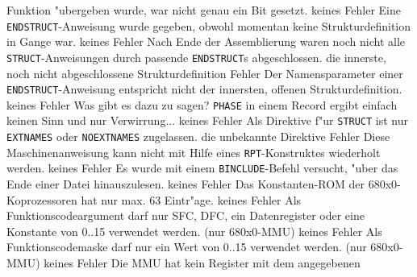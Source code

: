 \documentclass[12pt,a4paper,twoside]{report}
\newcommand{\tty}[1]{{\tt #1}}
\begin{document}
{\begin{description}
{                Funktion "ubergeben wurde, war nicht genau ein Bit
                gesetzt.}
               {keines}
               {Fehler}
               {Eine \tty{ENDSTRUCT}-Anweisung wurde gegeben, obwohl
                momentan keine Strukturdefinition in Gange war.}
               {keines}
               {Fehler}
               {Nach Ende der Assemblierung waren noch nicht alle
                \tty{STRUCT}-Anweisungen durch passende \tty{ENDSTRUCT}s
                abgeschlossen.}
               {die innerste, noch nicht abgeschlossene
                Strukturdefinition}
               {Fehler}
               {Der Namensparameter einer \tty{ENDSTRUCT}-Anweisung
                entspricht nicht der innersten, offenen
                Strukturdefinition.}
               {keines}
               {Fehler}
               {Was gibt es dazu zu sagen?  \tty{PHASE} in einem Record
                ergibt einfach keinen Sinn und nur Verwirrung...}
               {keines}
\errentry{1554}{ung"ultige \tty{STRUCT}-Direktive}
               {Fehler}
               {Als Direktive f"ur \tty{STRUCT} ist nur
                \tty{EXTNAMES} oder \tty{NOEXTNAMES} zugelassen.}
               {die unbekannte Direktive}
               {Fehler} 
               {Diese Maschinenanweisung kann nicht mit Hilfe eines
                {\tt RPT}-Konstruktes wiederholt werden.}
               {keines}
               {Fehler}
               {Es wurde mit einem \tty{BINCLUDE}-Befehl versucht,
                "uber das Ende einer Datei hinauszulesen.}
               {keines}
               {Fehler}
               {Das Konstanten-ROM der 680x0-Koprozessoren hat
                nur max. 63 Eintr"age.}
               {keines}
               {Fehler}
               {Als Funktionscodeargument darf nur SFC, DFC, ein
                Datenregister oder eine Konstante von 0..15 verwendet
                werden. (nur 680x0-MMU)}
               {keines}
               {Fehler}
               {Als Funktionscodemaske darf nur ein Wert von
                0..15 verwendet werden. (nur 680x0-MMU)}
               {keines}
               {Fehler}
               {Die MMU hat kein Register mit dem angegebenen
}
\end{description}}
\end{document}
